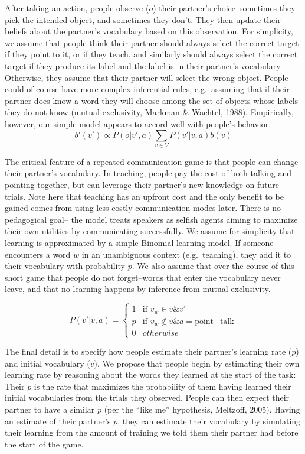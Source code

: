 \documentclass[10pt, letterpaper]{article}
\begin{document}
After taking an action, people observe (\(o\)) their partner's
choice--sometimes they pick the intended object, and sometimes they
don't. They then update their beliefs about the partner's vocabulary
based on this observation. For simplicity, we assume that people think
their partner should always select the correct target if they point to
it, or if they teach, and similarly should always select the correct
target if they produce its label and the label is in their partner's
vocabulary. Otherwise, they assume that their partner will select the
wrong object. People could of course have more complex inferential
rules, e.g.~assuming that if their partner does know a word they will
choose among the set of objects whose labels they do not know (mutual
exclusivity, Markman \& Wachtel, 1988). Empirically, however, our simple
model appears to accord well with people's behavior. \[
b'(v') \propto P\left(o|v',a\right) \sum_{v \in V}P\left(v'|v,a\right)b\left(v\right)
\]

The critical feature of a repeated communication game is that people can
change their partner's vocabulary. In teaching, people pay the cost of
both talking and pointing together, but can leverage their partner's new
knowledge on future trials. Note here that teaching has an upfront cost
and the only benefit to be gained comes from using less costly
communication modes later. There is no pedagogical goal-- the model
treats speakers as selfish agents aiming to maximize their own utilities
by communicating successfully. We assume for simplicity that learning is
approximated by a simple Binomial learning model. If someone encounters
a word \(w\) in an unambiguous context (e.g.~teaching), they add it to
their vocabulary with probability \(p\). We also assume that over the
course of this short game that people do not forget--words that enter
the vocabulary never leave, and that no learning happens by inference
from mutual exclusivity.

\[
P\left(v'|v,a\right)= \begin{cases} 
1 & \text{if } v_{w} \in v \& v'\\ 
p & \text{if } v_{w} \notin v \& a = \text{point+talk}\\ 
0 & otherwise\end{cases}
\]

The final detail is to specify how people estimate their partner's
learning rate (\(p\)) and initial vocabulary (\(v\)). We propose that
people begin by estimating their own learning rate by reasoning about
the words they learned at the start of the task: Their \(p\) is the rate
that maximizes the probability of them having learned their initial
vocabularies from the trials they observed. People can then expect their
partner to have a similar \(p\) (per the ``like me'' hypothesis,
Meltzoff, 2005). Having an estimate of their partner's \(p\), they can
estimate their vocabulary by simulating their learning from the amount
of training we told them their partner had before the start of the game.
\end{document}
